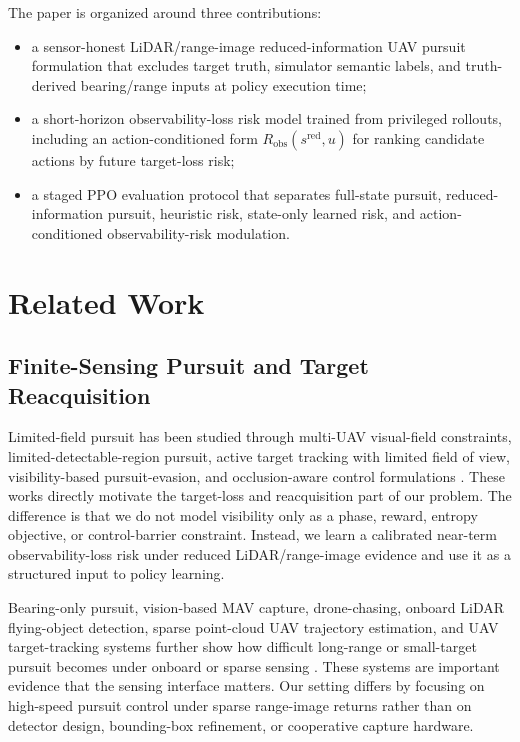 \documentclass[lettersize,journal]{IEEEtran}
\begin{document}
The paper is organized around three contributions:
\begin{itemize}
  \item a sensor-honest LiDAR/range-image reduced-information UAV pursuit formulation that excludes target truth, simulator semantic labels, and truth-derived bearing/range inputs at policy execution time;
  \item a short-horizon observability-loss risk model trained from privileged rollouts, including an action-conditioned form $R_{\mathrm{obs}}(s^{\mathrm{red}},u)$ for ranking candidate actions by future target-loss risk;
  \item a staged PPO evaluation protocol that separates full-state pursuit, reduced-information pursuit, heuristic risk, state-only learned risk, and action-conditioned observability-risk modulation.
\end{itemize}

\section{Related Work}

\subsection{Finite-Sensing Pursuit and Target Reacquisition}

Limited-field pursuit has been studied through multi-UAV visual-field constraints, limited-detectable-region pursuit, active target tracking with limited field of view, visibility-based pursuit-evasion, and occlusion-aware control formulations \cite{peng2025limitedvisual,huh2026limiteddetectable,yang2023activeattse3,wang2025viper,zhou2025visibilityocclusion}. These works directly motivate the target-loss and reacquisition part of our problem. The difference is that we do not model visibility only as a phase, reward, entropy objective, or control-barrier constraint. Instead, we learn a calibrated near-term observability-loss risk under reduced LiDAR/range-image evidence and use it as a structured input to policy learning.

Bearing-only pursuit, vision-based MAV capture, drone-chasing, onboard LiDAR flying-object detection, sparse point-cloud UAV trajectory estimation, and UAV target-tracking systems further show how difficult long-range or small-target pursuit becomes under onboard or sparse sensing \cite{li2025bearingonly,mavcapturingmav2024,cao2019droneschasing,vrba2025onboardlidar,liang2024sparseuavlidar,zhang2019coarsetofine,park2023lidardrone}. These systems are important evidence that the sensing interface matters. Our setting differs by focusing on high-speed pursuit control under sparse range-image returns rather than on detector design, bounding-box refinement, or cooperative capture hardware.
\end{document}
